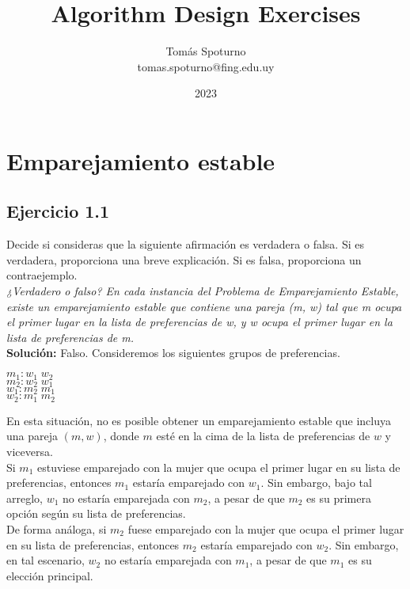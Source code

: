 \documentclass{article}
\title{Algorithm Design Exercises}
\author{ Tomás Spoturno \\ tomas.spoturno@fing.edu.uy }
\date{2023}
\begin{document}
\maketitle \newpage

\tableofcontents \newpage




\section{Emparejamiento estable}

\subsection{Ejercicio 1.1}
Decide si consideras que la siguiente afirmación es verdadera o falsa. Si es verdadera, proporciona una breve explicación. Si es falsa, proporciona un contraejemplo. \\

\emph{¿Verdadero o falso? En cada instancia del Problema de Emparejamiento Estable, existe un emparejamiento estable que contiene una pareja (m, w) tal que m ocupa el primer lugar en la lista de preferencias de w, y w ocupa el primer lugar en la lista de preferencias de m.} \\ 

\textbf{Solución:} Falso. Consideremos los siguientes grupos de preferencias.
\begin{center}
$m_1: w_1 \; w_2$\\
$m_2: w_2 \; w_1$\\
$w_1: m_2 \; m_1 $\\
$w_2: m_1 \; m_2$
\end{center}

En esta situación, no es posible obtener un emparejamiento estable que incluya una pareja $(m, w)$, donde $m$ esté en la cima de la lista de preferencias de $w$ y viceversa. \\

Si $m_1$ estuviese emparejado con la mujer que ocupa el primer lugar en su lista de preferencias, entonces $m_1$ estaría emparejado con $w_1$. Sin embargo, bajo tal arreglo, $w_1$ no estaría emparejada con $m_2$, a pesar de que $m_2$ es su primera opción según su lista de preferencias.\\

De forma análoga, si $m_2$ fuese emparejado con la mujer que ocupa el primer lugar en su lista de preferencias, entonces $m_2$ estaría emparejado con $w_2$. Sin embargo, en tal escenario, $w_2$ no estaría emparejada con $m_1$, a pesar de que $m_1$ es su elección principal.\\
\end{document}
